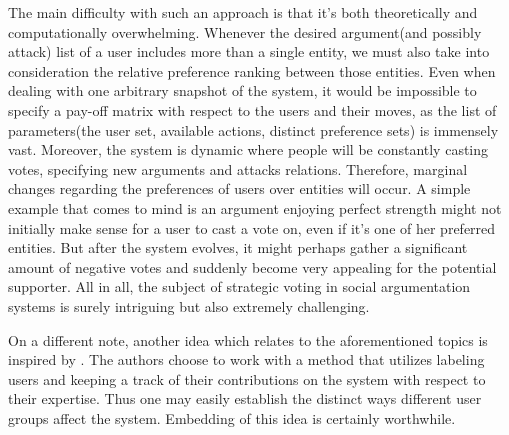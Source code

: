 \documentclass{article}
\begin{document}
The main difficulty with such an approach is that it's both theoretically and computationally overwhelming. Whenever the desired argument(and possibly attack) list of a user includes more than a single entity, we must also take into consideration the relative preference ranking between those entities. Even when dealing with one arbitrary snapshot of the system, it would be impossible to specify a pay-off matrix with respect to the users and their moves, as the list of parameters(the user set, available actions, distinct preference sets) is immensely vast. Moreover, the system is dynamic where people will be constantly casting votes, specifying new arguments and attacks relations. Therefore, marginal changes regarding the preferences of users over entities will occur. A simple example that comes to mind is an argument enjoying perfect strength might not initially make sense for a user to cast a vote on, even if it's one of her preferred entities. But after the system evolves, it might perhaps gather a significant amount of negative votes and suddenly become very appealing for the potential supporter. All in all, the subject of strategic voting in social argumentation systems is surely intriguing but also extremely challenging. 

On a different note, another idea which relates to the aforementioned topics is inspired by \cite{maudetComma}. The authors choose to work with a method that utilizes labeling users and keeping a track of their contributions on the system with respect to their expertise. Thus one may easily establish the distinct ways different user groups affect the system. Embedding of this idea is certainly worthwhile.





\end{document}
